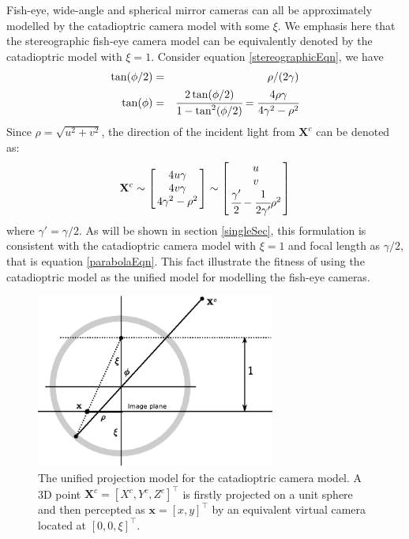 \documentclass{report}
\begin{document}
Fish-eye, wide-angle and spherical mirror cameras can all be approximately modelled by the catadioptric camera model with some $\xi$. We emphasis here that the stereographic fish-eye camera model can be equivalently denoted by the catadioptric model with $\xi = 1$. Consider equation \ref{stereographicEqn}, we have 
\begin{eqnarray}
\tan(\phi / 2) &=& \rho / (2 \gamma) \\
\tan(\phi) &=& \cfrac{2 \tan(\phi / 2)}{1 - \tan^2(\phi / 2)} = \cfrac{4 \rho \gamma}{4 \gamma^2 - \rho^2}
\end{eqnarray}
Since $\rho = \sqrt{u^2 + v^2}$, the direction of the incident light from $\mathbf{X}^c$ can be denoted as: 
\begin{equation}
\mathbf{X}^c \sim 
\arraycolsep=1.5pt%
\begin{bmatrix}
\begin{array}{c}
4 u \gamma \\ 4 v \gamma \\ 4 \gamma^2 - \rho^2
\end{array}
\end{bmatrix} \sim
\arraycolsep=1.5pt%
\begin{bmatrix}
\begin{array}{c}
u \\ v \\ \cfrac{\gamma'}{2} - \cfrac{1}{2\gamma'} \rho^2
\end{array}
\end{bmatrix} 
\end{equation}
where $\gamma' = \gamma / 2$. As will be shown in section \ref{singleSec}, this formulation is consistent with the catadioptric camera model with $\xi = 1$ and focal length as $\gamma / 2$, that is equation \ref{parabolaEqn}. This fact illustrate the fitness of using the catadioptric model as the unified model for modelling the fish-eye cameras. 


\begin{figure}
\centering
\includegraphics[width = 0.7\textwidth]{images/lift2Dd.eps}
\caption{The unified projection model for the catadioptric camera model. A 3D point $\mathbf{X}^c = [X^c, Y^c, Z^c]^\top$ is firstly projected on a unit sphere and then percepted as $\mathbf{x} = [x, y]^\top$ by an equivalent virtual camera located at $[0, 0, \xi]^\top$. }
\label{cataFig}
\end{figure}
\end{document}
